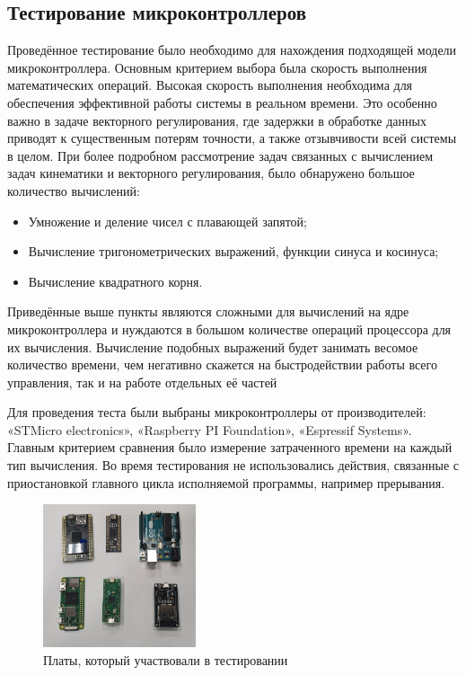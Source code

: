     \subsection{Тестирование микроконтроллеров}

    Проведённое тестирование было необходимо для нахождения подходящей модели микроконтроллера. Основным критерием выбора была скорость выполнения математических операций. Высокая скорость выполнения необходима для обеспечения эффективной работы системы в реальном времени. Это особенно важно в задаче векторного регулирования, где задержки в обработке данных приводят к существенным потерям точности, а также отзывчивости всей системы в целом.	При более подробном рассмотрение задач связанных с вычислением задач кинематики и векторного регулирования, было обнаружено большое количество вычислений:
    \begin{itemize}
        \item Умножение и деление чисел с плавающей запятой;
        \item Вычисление тригонометрических выражений, функции синуса и косинуса;
        \item Вычисление квадратного корня.
    \end{itemize}

    Приведённые выше пункты являются сложными для вычислений на ядре микроконтроллера и нуждаются в большом количестве операций процессора для их вычисления.  Вычисление подобных выражений будет занимать весомое количество времени, чем негативно скажется на быстродействии работы всего управления, так и на работе отдельных её частей


    Для проведения теста были выбраны микроконтроллеры от производителей: «STMicro electronics», «Raspberry PI Foundation», «Espressif Systems». 
    Главным критерием сравнения было измерение затраченного времени на каждый тип вычисления. Во время тестирования не использовались действия, связанные с приостановкой главного цикла исполняемой программы, например прерывания.  

    \begin{figure}[H]
        \centering
        \includegraphics[width=0.4\textwidth]{Src/images/TestDevices.png}
        \caption{Платы, который участвовали в тестировании}
        \label{Test}
    \end{figure}

